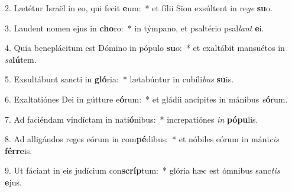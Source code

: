 2. Lætétur Israël in eo, qui fecit \textbf{e}um:~*  et fílii Sion exsúltent in re\textit{ge} \textbf{su}o.\

3. Laudent nomen ejus in \textbf{cho}ro:~*  in týmpano, et psaltério psal\textit{lant} \textbf{e}i.\

4. Quia beneplácitum est Dómino in pópulo \textbf{su}o:~*  et exaltábit mansuétos in \textit{sa}\textbf{lú}tem.\

5. Exsultábunt sancti in \textbf{gló}ria:~*  lætabúntur in cubíli\textit{bus} \textbf{su}is.\

6. Exaltatiónes Dei in gútture e\textbf{ó}rum:~*  et gládii ancípites in mánibus \textit{e}\textbf{ó}rum.\

7. Ad faciéndam vindíctam in nati\textbf{ó}nibus:~*  increpatiónes \textit{in} \textbf{pó}\textbf{pu}lis.\

8. Ad alligándos reges eórum in com\textbf{pé}dibus:~*  et nóbiles eórum in máni\textit{cis} \textbf{fér}\textbf{re}is.\

9. Ut fáciant in eis judícium con\textbf{scríp}tum:~*  glória hæc est ómnibus sanc\textit{tis} \textbf{e}jus.\

